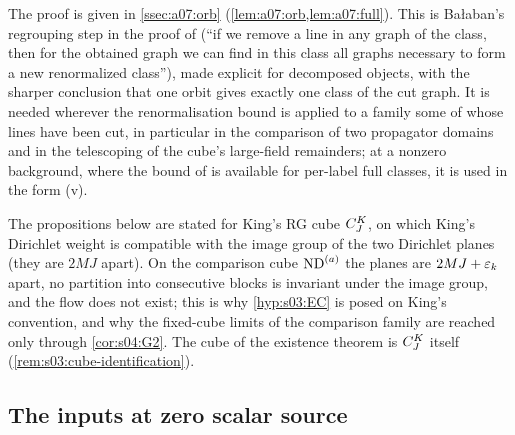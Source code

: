 The proof is given in \cref{ssec:a07:orb} (\cref{lem:a07:orb,lem:a07:full}). This is Ba{\l}aban's regrouping step in the proof of \cite[Prop.~1, p.~432]{Ba3} (``if we remove a line in any graph of the class, then for the obtained graph we can find in this class all graphs necessary to form a new renormalized class''), made explicit for decomposed objects, with the sharper conclusion that one orbit gives exactly one class of the cut graph. It is needed wherever the renormalisation bound is applied to a family some of whose lines have been cut, in particular in the comparison of two propagator domains and in the telescoping of the cube's large-field remainders; at a nonzero background, where the bound of \cite[Prop.~1]{Ba3} is available for per-label full classes, it is used in the form \textup{(v)}.

\begin{remark}\label{rem:k01:cube}
The propositions below are stated for King's RG cube $C^{K}_{J}$, on which King's Dirichlet weight is compatible with the image group of the two Dirichlet planes (they are $2MJ$ apart). On the comparison cube $\mathrm{ND}^{(a)}$ the planes are $2MJ+\varepsilon_k$ apart, no partition into consecutive blocks is invariant under the image group, and the flow does not exist; this is why \cref{hyp:s03:EC} is posed on King's convention, and why the fixed-cube limits of the comparison family are reached only through \cref{cor:s04:G2}. The cube of the existence theorem is $C^{K}_{J}$ itself (\cref{rem:s03:cube-identification}).
\end{remark}

\subsection{The inputs at zero scalar source}\label{ssec:k01:inputs}

